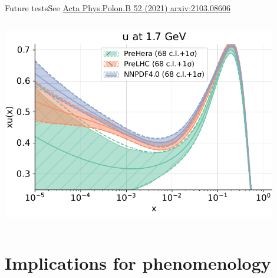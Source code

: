 \documentclass[aspectratio=169,9pt]{beamer}
\begin{document}
\begin{frame}[t]{Future tests}{See \href{https://arxiv.org/pdf/2111.05787.pdf}{\color{blue}Acta Phys.Polon.B 52 (2021) arxiv:2103.08606}}
\begin{columns}
        \includegraphics[width=0.9\textwidth]{diffu}
    \end{columns}
\end{frame}


\section{Implications for phenomenology}
\end{document}
